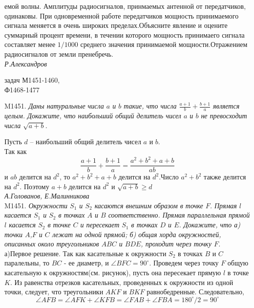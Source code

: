 \documentclass[russian,10pt,a4paper,twocolumn]{article}
\begin{document}
	\noindent
	емой волны. Амплитуды радиосигналов, принмаемых антенной от передатчиков, одинаковы. При одновременной работе передатчиков мощность принимаемого сигнала меняется в очень широких пределах.Объясните явление и оцените суммарный процент времени, в течении которого мощность принимаего сигнала составляет менее $1/1000$ среднего значения принимаемой мощности.Отражением радиосигналов от земли пренебречь.\\
	{\slshape Р.Александров}

	\vspace{20pt}
	
	
	\noindent 
	{ задач М1451-1460,\\Ф1468-1477\\}
	
	
	\noindent M1451. {\slshape Даны натуральные числа $a$ и $b$ такие, что числа $\frac{a+1}{b}+\frac{b+1}{a}$ является целым. Докажите, что наибольший общий делитель чисел $a$ и $b$ не превосходит числа $\sqrt{a+b}$.}
	
	Пусть $d$ -- наибольший общий делитель чисел $a$ и $b$. \\ Так как
	\[
		\frac{a+1}{b} + \frac{b+1}{a} = \frac{a^2 +b^2 +a+b}{ab}   
	\]
	и $ab$ делится на $d^2$, то  $a^2+b^2+a+b$ делится на $d^2$.Число $a^2+b^2$ также делится на $d^2$. Поэтому $a+b$ делится на $d^2$ и $\sqrt{a+b} \ge d$\\
	{\slshape А.Голованов, Е.Малинникова}\\
	
	
	\noindent
	M1451. {\slshape Окружности $S_1$ и $S_2$ касаются внешним образом в точке $F$. Прямая $l$ касается $S_1$ и $S_2$ в точках $A$ и $B$ соответственно. Прямая параллельная прямой $l$ касается $S_2$ в точке $C$ и пересекает $S_1$ в точках $D$ и $E$. Докажите, что а) точки $A$,$F$ и $C$ лежат на одной прямой; б) общая хорда окружностей, описанных около треугольников $ABC$ и $BDE$, проходит через точку $F$. }\\
	
	а)Первое решение. Так как касательные к окружности $S_2$ в точках $B$ и $C$ паралельны, то $BC$ - ее диаметр, и $\angle BFC=90^{\circ}$. Проведем через точку $F$ общую касательную к окружностям(см. рисунок), пусть она пересекает прямую $l$ в точке $K$. Из равенства отрезков касательных, проведенных  к окружности из одной точки, следует, что треугольники $AKF$ и $BKF$ равнобедренные. Следовательно,
	\[
	\angle AFB=\angle AFK + \angle KFB = \angle FAB + \angle FBA = 180^{\circ}/2=90^{\circ}
	\]
	
\end{document}
